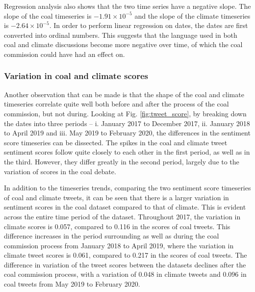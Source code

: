 \documentclass[12pt,onecolumn,twoside]{layout}
\begin{document}
Regression analysis also shows that the two time series have a negative slope. The slope of the coal timeseries is $-1.91 \times 10^{-5}$ and the slope of the climate timeseries is $-2.64 \times 10^{-5}$. In order to perform linear regression on dates, the dates are first converted into ordinal numbers. This suggests that the language used in both coal and climate discussions become more negative over time, of which the coal commission could have had an effect on.

\subsubsection*{Variation in coal and climate scores} %
Another observation that can be made is that the shape of the coal and climate timeseries correlate quite well both before and after the process of the coal commission, but not during. Looking at Fig. \ref{fig:tweet_score}, by breaking down the dates into three periods -- i. January 2017 to December 2017, ii. January 2018 to April 2019 and iii. May 2019 to February 2020, the differences in the sentiment score timeseries can be dissected. The spikes in the coal and climate tweet sentiment scores follow quite closely to each other in the first period, as well as in the third. However, they differ greatly in the second period, largely due to the variation of scores in the coal debate.

In addition to the timeseries trends, comparing the two sentiment score timeseries of coal and climate tweets, it can be seen that there is a larger variation in sentiment scores in the coal dataset compared to that of climate. This is evident across the entire time period of the dataset. Throughout 2017, the variation in climate scores is 0.057, compared to 0.116 in the scores of coal tweets. This difference increases in the period surrounding as well as during the coal commission process from January 2018 to April 2019, where the variation in climate tweet scores is 0.061, compared to 0.217 in the scores of coal tweets. The difference in variation of the tweet scores between the datasets declines after the coal commission process, with a variation of 0.048 in climate tweets and 0.096 in coal tweets from May 2019 to February 2020.
\end{document}
